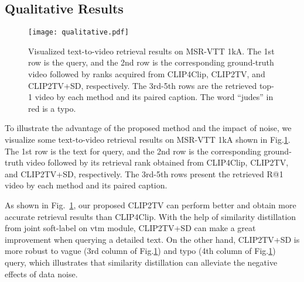 \subsection{Qualitative Results}

\begin{figure}[ht]
    \centering
    \texttt{[image: qualitative.pdf]}
    \caption{Visualized text-to-video retrieval results on MSR-VTT 1kA. The 1st row is the query, and the 2nd row is the corresponding ground-truth video followed by ranks acquired from CLIP4Clip, CLIP2TV, and CLIP2TV+SD, respectively. The 3rd-5th rows are the retrieved top-1 video by each method and its paired caption. The word ``judes'' in red is a typo.}
    \label{fig:qualitative}
\end{figure}

To illustrate the advantage of the proposed method and the impact of noise, we visualize some text-to-video retrieval results on MSR-VTT 1kA shown in Fig.\ref{fig:qualitative}. The 1st row is the text for query, and the 2nd row is the corresponding ground-truth video followed by its retrieval rank obtained from CLIP4Clip, CLIP2TV, and CLIP2TV+SD, respectively. The 3rd-5th rows present the retrieved R@1 video by each method and its paired caption. 

As shown in Fig.~\ref{fig:qualitative}, our proposed CLIP2TV can perform better and obtain more accurate retrieval results than CLIP4Clip. With the help of similarity distillation from joint soft-label on vtm module, CLIP2TV+SD can make a great improvement when querying a detailed text. On the other hand, CLIP2TV+SD is more robust to vague (3rd column of Fig.\ref{fig:qualitative}) and typo (4th column of Fig.\ref{fig:qualitative}) query, which illustrates that  similarity distillation can alleviate the negative effects of data noise.